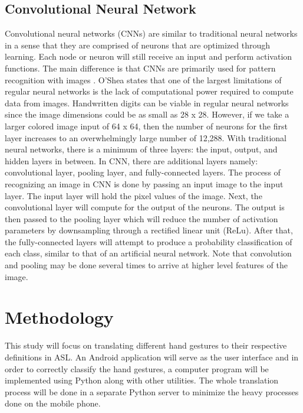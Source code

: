 \documentclass[journal]{./IEEE/IEEEtran}
\begin{document}
\subsection{Convolutional Neural Network}
Convolutional neural networks (CNNs) are similar to traditional neural networks in a sense that they are comprised of neurons that are optimized through learning. Each node or neuron will still receive an input and perform activation functions. The main difference is that CNNs are primarily used for pattern recognition with images \cite{OShea2015}.
\newline
\indent O'Shea \cite{OShea2015} states that one of the largest limitations of regular neural networks is the lack of computational power required to compute data from images. Handwritten digits can be viable in regular neural networks since the image dimensions could be as small as 28 x 28. However, if we take a larger colored image input of 64 x 64, then the number of neurons for the first layer increases to an overwhelmingly large number of 12,288.
\newline 
\indent With traditional neural networks, there is a minimum of three layers: the input, output, and hidden layers in between. In CNN, there are additional layers namely: convolutional layer, pooling layer, and fully-connected layers. The process of recognizing an image in CNN is done by passing an input image to the input layer. The input layer will hold the pixel values of the image. Next, the convolutional layer will compute for the output of the neurons. The output is then passed to the pooling layer which will reduce the number of activation parameters by downsampling through a rectified linear unit (ReLu). After that, the fully-connected layers will attempt to produce a probability classification of each class, similar to that of an artificial neural network. Note that convolution and pooling may be done several times to arrive at higher level features of the image.

\section{Methodology}
This study will focus on translating different hand gestures to their respective definitions in ASL. An Android application will serve as the user interface and in order to correctly classify the hand gestures, a computer program will be implemented using Python along with other utilities. The whole translation process will be done in a separate Python server to minimize the heavy processes done on the mobile phone.
\end{document}

